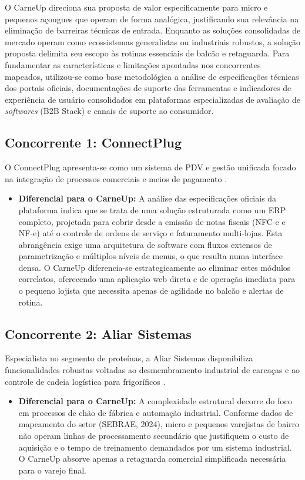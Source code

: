 \documentclass[
	12pt,				%
	openany,			%
	oneside,			%
	a4paper,			%
	english,			%
	french,				%
	spanish,			%
	brazil				%
	]{abntex2}
\begin{document}
O CarneUp direciona sua proposta de valor especificamente para micro e pequenos açougues que operam de forma analógica, justificando sua relevância na eliminação de barreiras técnicas de entrada. Enquanto as soluções consolidadas de mercado operam como ecossistemas generalistas ou industriais robustos, a solução proposta delimita seu escopo às rotinas essenciais de balcão e retaguarda. Para fundamentar as características e limitações apontadas nos concorrentes mapeados, utilizou-se como base metodológica a análise de especificações técnicas dos portais oficiais, documentações de suporte das ferramentas e indicadores de experiência de usuário consolidados em plataformas especializadas de avaliação de \textit{softwares} (B2B Stack) e canais de suporte ao consumidor.

\subsection{Concorrente 1: ConnectPlug}
O ConnectPlug apresenta-se como um sistema de PDV e gestão unificada focado na integração de processos comerciais e meios de pagamento \cite{connectplug}.
\begin{itemize}
    \item \textbf{Diferencial para o CarneUp:} A análise das especificações oficiais da plataforma indica que se trata de uma solução estruturada como um ERP completo, projetada para cobrir desde a emissão de notas fiscais (NFC-e e NF-e) até o controle de ordens de serviço e faturamento multi-lojas. Esta abrangência exige uma arquitetura de software com fluxos extensos de parametrização e múltiplos níveis de menus, o que resulta numa interface densa. O CarneUp diferencia-se estrategicamente ao eliminar estes módulos correlatos, oferecendo uma aplicação web direta e de operação imediata para o pequeno lojista que necessita apenas de agilidade no balcão e alertas de rotina.
\end{itemize}

\subsection{Concorrente 2: Aliar Sistemas}
Especialista no segmento de proteínas, a Aliar Sistemas disponibiliza funcionalidades robustas voltadas ao desmembramento industrial de carcaças e ao controle de cadeia logística para frigoríficos \cite{aliar}.
\begin{itemize}
    \item \textbf{Diferencial para o CarneUp:} A complexidade estrutural decorre do foco em processos de chão de fábrica e automação industrial. Conforme dados de mapeamento do setor (SEBRAE, 2024), micro e pequenos varejistas de bairro não operam linhas de processamento secundário que justifiquem o custo de aquisição e o tempo de treinamento demandados por um sistema industrial. O CarneUp absorve apenas a retaguarda comercial simplificada necessária para o varejo final.
\end{itemize}
\end{document}
